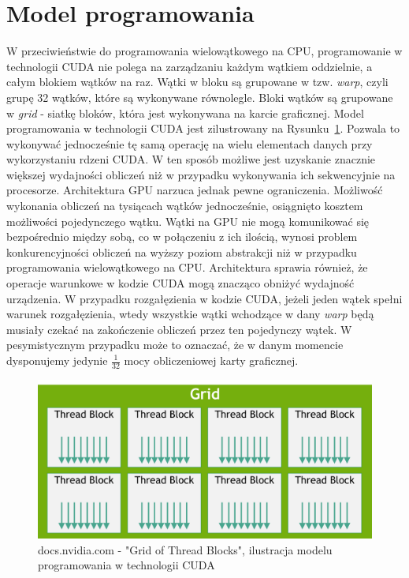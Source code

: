 \section{Model programowania}
W przeciwieństwie do programowania wielowątkowego na CPU, programowanie w technologii CUDA nie polega na zarządzaniu każdym wątkiem oddzielnie, a całym blokiem wątków na raz. Wątki w bloku są grupowane w tzw. \textit{warp}, czyli grupę 32 wątków, które są wykonywane równolegle. Bloki wątków są grupowane w \textit{grid} - siatkę bloków, która jest wykonywana na karcie graficznej. Model programowania w technologii CUDA jest zilustrowany na Rysunku~\ref{fig:Grid of Thread Blocks}. Pozwala to wykonywać jednocześnie tę samą operację na wielu elementach danych przy wykorzystaniu rdzeni CUDA. W ten sposób możliwe jest uzyskanie znacznie większej wydajności obliczeń niż w przypadku wykonywania ich sekwencyjnie na procesorze. Architektura GPU narzuca jednak pewne ograniczenia. Możliwość wykonania obliczeń na tysiącach wątków jednocześnie, osiągnięto kosztem możliwości pojedynczego wątku. Wątki na GPU nie mogą komunikować się bezpośrednio między sobą, co w połączeniu z ich ilością, wynosi problem konkurencyjności obliczeń na wyższy poziom abstrakcji niż w przypadku programowania wielowątkowego na CPU. Architektura sprawia również, że operacje warunkowe w kodzie CUDA mogą znacząco obniżyć wydajność urządzenia. W przypadku rozgałęzienia w kodzie CUDA, jeżeli jeden wątek spełni warunek rozgałęzienia, wtedy wszystkie wątki wchodzące w dany \textit{warp} będą musiały czekać na zakończenie obliczeń przez ten pojedynczy wątek. W pesymistycznym przypadku może to oznaczać, że w danym momencie dysponujemy jedynie $\frac{1}{32}$ mocy obliczeniowej karty graficznej.
\begin{figure}
    \centering
    \includegraphics[scale=0.5]{./fig/grid-of-thread-blocks.png}
    \caption{docs.nvidia.com - "Grid of Thread Blocks", ilustracja modelu programowania w technologii CUDA}
    \label{fig:Grid of Thread Blocks}
\end{figure}




